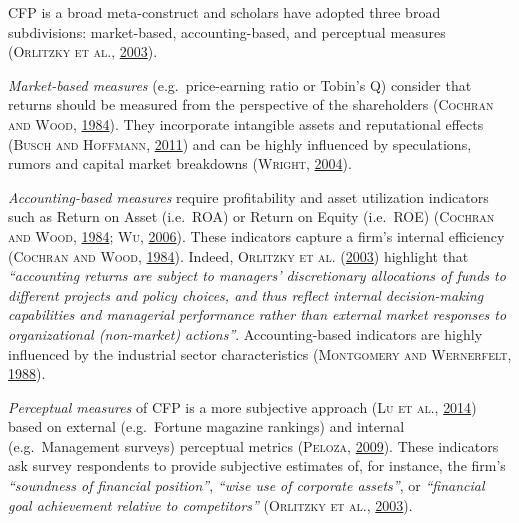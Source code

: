 \documentclass[12pt,]{article}
\begin{document}
CFP is a broad meta-construct and scholars have adopted three broad
subdivisions: market-based, accounting-based, and perceptual measures
(\textsc{Orlitzky et al.}, \protect\hyperlink{ref-Orlitzky2003}{2003}).

\emph{Market-based measures} (e.g.~price-earning ratio or Tobin's Q)
consider that returns should be measured from the perspective of the
shareholders (\textsc{Cochran and Wood},
\protect\hyperlink{ref-Cochran1984a}{1984}). They incorporate intangible
assets and reputational effects (\textsc{Busch and Hoffmann},
\protect\hyperlink{ref-Busch2011a}{2011}) and can be highly influenced
by speculations, rumors and capital market breakdowns (\textsc{Wright},
\protect\hyperlink{ref-Wright2004}{2004}).

\emph{Accounting-based measures} require profitability and asset
utilization indicators such as Return on Asset (i.e.~ROA) or Return on
Equity (i.e.~ROE) (\textsc{Cochran and Wood},
\protect\hyperlink{ref-Cochran1984a}{1984}; \textsc{Wu},
\protect\hyperlink{ref-Wu2006}{2006}). These indicators capture a firm's
internal efficiency (\textsc{Cochran and Wood},
\protect\hyperlink{ref-Cochran1984a}{1984}). Indeed, \textsc{Orlitzky et
al.} (\protect\hyperlink{ref-Orlitzky2003}{2003}) highlight that
\emph{``accounting returns are subject to managers' discretionary
allocations of funds to different projects and policy choices, and thus
reflect internal decision-making capabilities and managerial performance
rather than external market responses to organizational (non-market)
actions''}. Accounting-based indicators are highly influenced by the
industrial sector characteristics (\textsc{Montgomery and Wernerfelt},
\protect\hyperlink{ref-Montgomery1988}{1988}).

\emph{Perceptual measures} of CFP is a more subjective approach
(\textsc{Lu et al.},
\protect\hyperlink{ref-Ludecadedebatenexus2014}{2014}) based on external
(e.g.~Fortune magazine rankings) and internal (e.g.~Management surveys)
perceptual metrics (\textsc{Peloza},
\protect\hyperlink{ref-Peloza2009}{2009}). These indicators ask survey
respondents to provide subjective estimates of, for instance, the firm's
\emph{``soundness of financial position''}, \emph{``wise use of
corporate assets''}, or \emph{``financial goal achievement relative to
competitors''} (\textsc{Orlitzky et al.},
\protect\hyperlink{ref-Orlitzky2003}{2003}).
\end{document}
